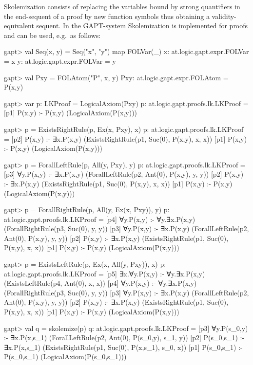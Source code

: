 \documentclass[a4paper,11pt]{article}
\begin{document}
Skolemization consists of replacing the variables bound by strong quantifiers in the end-sequent of a proof
by new function symbols thus obtaining a validity-equivalent sequent. In the GAPT-system Skolemization
is implemented for proofs and can be used, e.g.~as follows:
%
\begin{clilisting}
gapt> val Seq(x, y) = Seq("x", "y") map {FOLVar(_)}
x: at.logic.gapt.expr.FOLVar = x
y: at.logic.gapt.expr.FOLVar = y

gapt> val Pxy = FOLAtom("P", x, y)
Pxy: at.logic.gapt.expr.FOLAtom = P(x,y)

gapt> var p: LKProof = LogicalAxiom(Pxy)
p: at.logic.gapt.proofs.lk.LKProof =
[p1] P(x,y) :- P(x,y)    (LogicalAxiom(P(x,y)))

gapt> p = ExistsRightRule(p, Ex(x, Pxy), x)
p: at.logic.gapt.proofs.lk.LKProof = [p2] P(x,y) :- ∃x.P(x,y)    (ExistsRightRule(p1, Suc(0), P(x,y), x, x))
[p1] P(x,y) :- P(x,y)    (LogicalAxiom(P(x,y)))

gapt> p = ForallLeftRule(p, All(y, Pxy), y)
p: at.logic.gapt.proofs.lk.LKProof = [p3] ∀y.P(x,y) :- ∃x.P(x,y)    (ForallLeftRule(p2, Ant(0), P(x,y), y, y))
[p2] P(x,y) :- ∃x.P(x,y)    (ExistsRightRule(p1, Suc(0), P(x,y), x, x))
[p1] P(x,y) :- P(x,y)    (LogicalAxiom(P(x,y)))

gapt> p = ForallRightRule(p, All(y, Ex(x, Pxy)), y)
p: at.logic.gapt.proofs.lk.LKProof = [p4] ∀y.P(x,y) :- ∀y.∃x.P(x,y)    (ForallRightRule(p3, Suc(0), y, y))
[p3] ∀y.P(x,y) :- ∃x.P(x,y)    (ForallLeftRule(p2, Ant(0), P(x,y), y, y))
[p2] P(x,y) :- ∃x.P(x,y)    (ExistsRightRule(p1, Suc(0), P(x,y), x, x))
[p1] P(x,y) :- P(x,y)    (LogicalAxiom(P(x,y)))

gapt> p = ExistsLeftRule(p, Ex(x, All(y, Pxy)), x)
p: at.logic.gapt.proofs.lk.LKProof = [p5] ∃x.∀y.P(x,y) :- ∀y.∃x.P(x,y)    (ExistsLeftRule(p4, Ant(0), x, x))
[p4] ∀y.P(x,y) :- ∀y.∃x.P(x,y)    (ForallRightRule(p3, Suc(0), y, y))
[p3] ∀y.P(x,y) :- ∃x.P(x,y)    (ForallLeftRule(p2, Ant(0), P(x,y), y, y))
[p2] P(x,y) :- ∃x.P(x,y)    (ExistsRightRule(p1, Suc(0), P(x,y), x, x))
[p1] P(x,y) :- P(x,y)    (LogicalAxiom(P(x,y)))

gapt> val q = skolemize(p)
q: at.logic.gapt.proofs.lk.LKProof =
[p3] ∀y.P(s_{0},y) :- ∃x.P(x,s_{1})    (ForallLeftRule(p2, Ant(0), P(s_{0},y), s_{1}, y))
[p2] P(s_{0},s_{1}) :- ∃x.P(x,s_{1})    (ExistsRightRule(p1, Suc(0), P(x,s_{1}), s_{0}, x))
[p1] P(s_{0},s_{1}) :- P(s_{0},s_{1})    (LogicalAxiom(P(s_{0},s_{1})))

\end{clilisting}
\end{document}
